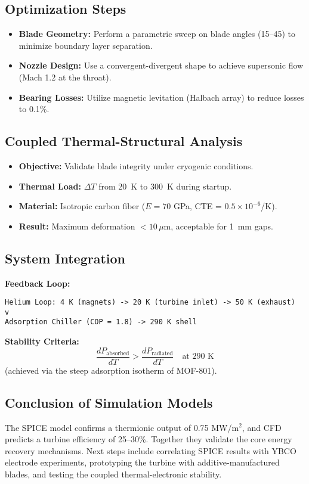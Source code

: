 \documentclass[12pt]{article}
\begin{document}
\subsection{Optimization Steps}
\begin{itemize}
    \item \textbf{Blade Geometry:} Perform a parametric sweep on blade angles (15\textdegree--45\textdegree) to minimize boundary layer separation.
    \item \textbf{Nozzle Design:} Use a convergent-divergent shape to achieve supersonic flow (Mach 1.2 at the throat).
    \item \textbf{Bearing Losses:} Utilize magnetic levitation (Halbach array) to reduce losses to 0.1\%.
\end{itemize}

\subsection{Coupled Thermal-Structural Analysis}
\begin{itemize}
    \item \textbf{Objective:} Validate blade integrity under cryogenic conditions.
    \item \textbf{Thermal Load:} $\Delta T$ from 20~K to 300~K during startup.
    \item \textbf{Material:} Isotropic carbon fiber ($E = 70$ GPa, CTE = $0.5\times10^{-6}$/K).
    \item \textbf{Result:} Maximum deformation $<10\,\mu$m, acceptable for 1~mm gaps.
\end{itemize}

\subsection{System Integration}
\textbf{Feedback Loop:}

\begin{lstlisting}[basicstyle=\ttfamily\footnotesize]
Helium Loop: 4 K (magnets) -> 20 K (turbine inlet) -> 50 K (exhaust)
v
Adsorption Chiller (COP = 1.8) -> 290 K shell
\end{lstlisting}

\noindent \textbf{Stability Criteria:}
\[
\frac{dP_{\text{absorbed}}}{dT} > \frac{dP_{\text{radiated}}}{dT} \quad \text{at 290 K}
\]
(achieved via the steep adsorption isotherm of MOF-801).

\subsection{Conclusion of Simulation Models}
The SPICE model confirms a thermionic output of 0.75 MW/m$^2$, and CFD predicts a turbine efficiency of 25--30\%. Together they validate the core energy recovery mechanisms. Next steps include correlating SPICE results with YBCO electrode experiments, prototyping the turbine with additive-manufactured blades, and testing the coupled thermal-electronic stability.
\end{document}
